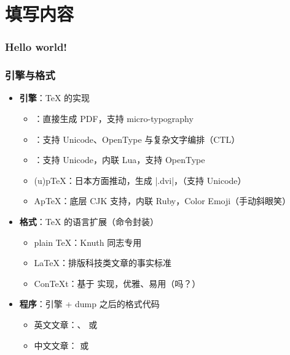 \section{填写内容}

\begin{frame}[fragile]
\frametitle{Hello world!}
\pause
{}
\end{frame}

\begin{frame}[fragile]
\frametitle{引擎与格式}
\begin{itemize}
  \item<+-> \textbf{引擎}：\TeX{} 的实现

    \begin{itemize}
      \item \pdfTeX{}：直接生成 PDF，支持 micro-typography
      \item \XeTeX{}：支持 Unicode、OpenType 与复杂文字编排（CTL）
      \item \LuaTeX{}：支持 Unicode，内联 Lua，支持 OpenType
      \item (u)p\TeX{}：日本方面推动，生成 |.dvi|，（支持 Unicode）
      \item Ap\TeX{}：底层 CJK 支持，内联 Ruby，Color Emoji（手动斜眼笑）
    \end{itemize}

  \item<+-> \textbf{格式}：\TeX{} 的语言扩展（命令封装）

    \begin{itemize}
      \item plain \TeX{}：Knuth 同志专用
      \item \LaTeX{}：排版科技类文章的事实标准
      \item Con\TeX t：基于 \LuaTeX{} 实现，优雅、易用（吗？）
    \end{itemize}

  \item<+-> \textbf{程序}：引擎 + dump 之后的格式代码

    \begin{itemize}
      \item \alert{英文文章：\pdfLaTeX{}、\XeLaTeX{} 或 \LuaLaTeX{}}
      \item \alert{中文文章：\XeLaTeX{} 或 \LuaLaTeX{}}
    \end{itemize}
\end{itemize}
\end{frame}

